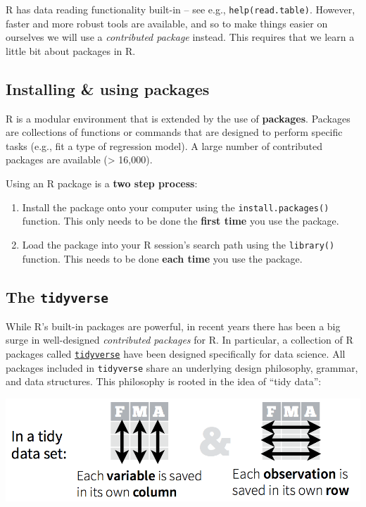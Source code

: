 \documentclass[
]{book}
\begin{document}
R has data reading functionality built-in -- see e.g.,
\texttt{help(read.table)}. However, faster and more robust tools are
available, and so to make things easier on ourselves we will use a
\emph{contributed package} instead. This requires that we
learn a little bit about packages in R.

\hypertarget{installing-using-packages}{%
\subsection{Installing \& using packages}\label{installing-using-packages}}

R is a modular environment that is extended by the use of \textbf{packages}.
Packages are collections of functions or commands that are designed to
perform specific tasks (e.g., fit a type of regression model). A large
number of contributed packages are available (\textgreater{} 16,000).

Using an R package is a \textbf{two step process}:

\begin{enumerate}
\def\labelenumi{\arabic{enumi}.}
\item
  Install the package onto your computer using the
  \texttt{install.packages()} function. This only needs to
  be done the \textbf{first time} you use the package.
\item
  Load the package into your R session's search path
  using the \texttt{library()} function. This needs to be done
  \textbf{each time} you use the package.
\end{enumerate}

\hypertarget{the-tidyverse}{%
\subsection{\texorpdfstring{The \texttt{tidyverse}}{The tidyverse}}\label{the-tidyverse}}

While R's built-in packages are powerful, in recent years there has
been a big surge in well-designed \emph{contributed packages} for R. In
particular, a collection of R packages called
\href{https://www.tidyverse.org/}{\texttt{tidyverse}} have been
designed specifically for data science. All packages included in
\texttt{tidyverse} share an underlying design philosophy, grammar, and
data structures. This philosophy is rooted in the idea of ``tidy data'':

\includegraphics{R/Rintro/images/tidy_data.png}
\end{document}
